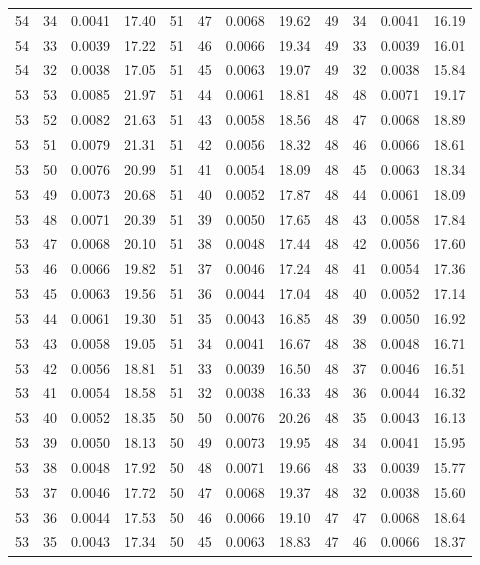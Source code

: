 \begin{tabular}{llll|llll|llll}
54 & 34 & 0.0041 & 17.40 & 51 & 47 & 0.0068 & 19.62 & 49 & 34 & 0.0041 & 16.19\\
54 & 33 & 0.0039 & 17.22 & 51 & 46 & 0.0066 & 19.34 & 49 & 33 & 0.0039 & 16.01\\
54 & 32 & 0.0038 & 17.05 & 51 & 45 & 0.0063 & 19.07 & 49 & 32 & 0.0038 & 15.84\\
53 & 53 & 0.0085 & 21.97 & 51 & 44 & 0.0061 & 18.81 & 48 & 48 & 0.0071 & 19.17\\
53 & 52 & 0.0082 & 21.63 & 51 & 43 & 0.0058 & 18.56 & 48 & 47 & 0.0068 & 18.89\\
53 & 51 & 0.0079 & 21.31 & 51 & 42 & 0.0056 & 18.32 & 48 & 46 & 0.0066 & 18.61\\
53 & 50 & 0.0076 & 20.99 & 51 & 41 & 0.0054 & 18.09 & 48 & 45 & 0.0063 & 18.34\\
53 & 49 & 0.0073 & 20.68 & 51 & 40 & 0.0052 & 17.87 & 48 & 44 & 0.0061 & 18.09\\
53 & 48 & 0.0071 & 20.39 & 51 & 39 & 0.0050 & 17.65 & 48 & 43 & 0.0058 & 17.84\\
53 & 47 & 0.0068 & 20.10 & 51 & 38 & 0.0048 & 17.44 & 48 & 42 & 0.0056 & 17.60\\
53 & 46 & 0.0066 & 19.82 & 51 & 37 & 0.0046 & 17.24 & 48 & 41 & 0.0054 & 17.36\\
53 & 45 & 0.0063 & 19.56 & 51 & 36 & 0.0044 & 17.04 & 48 & 40 & 0.0052 & 17.14\\
53 & 44 & 0.0061 & 19.30 & 51 & 35 & 0.0043 & 16.85 & 48 & 39 & 0.0050 & 16.92\\
53 & 43 & 0.0058 & 19.05 & 51 & 34 & 0.0041 & 16.67 & 48 & 38 & 0.0048 & 16.71\\
53 & 42 & 0.0056 & 18.81 & 51 & 33 & 0.0039 & 16.50 & 48 & 37 & 0.0046 & 16.51\\
53 & 41 & 0.0054 & 18.58 & 51 & 32 & 0.0038 & 16.33 & 48 & 36 & 0.0044 & 16.32\\
53 & 40 & 0.0052 & 18.35 & 50 & 50 & 0.0076 & 20.26 & 48 & 35 & 0.0043 & 16.13\\
53 & 39 & 0.0050 & 18.13 & 50 & 49 & 0.0073 & 19.95 & 48 & 34 & 0.0041 & 15.95\\
53 & 38 & 0.0048 & 17.92 & 50 & 48 & 0.0071 & 19.66 & 48 & 33 & 0.0039 & 15.77\\
53 & 37 & 0.0046 & 17.72 & 50 & 47 & 0.0068 & 19.37 & 48 & 32 & 0.0038 & 15.60\\
53 & 36 & 0.0044 & 17.53 & 50 & 46 & 0.0066 & 19.10 & 47 & 47 & 0.0068 & 18.64\\
53 & 35 & 0.0043 & 17.34 & 50 & 45 & 0.0063 & 18.83 & 47 & 46 & 0.0066 & 18.37\\

\end{tabular}

